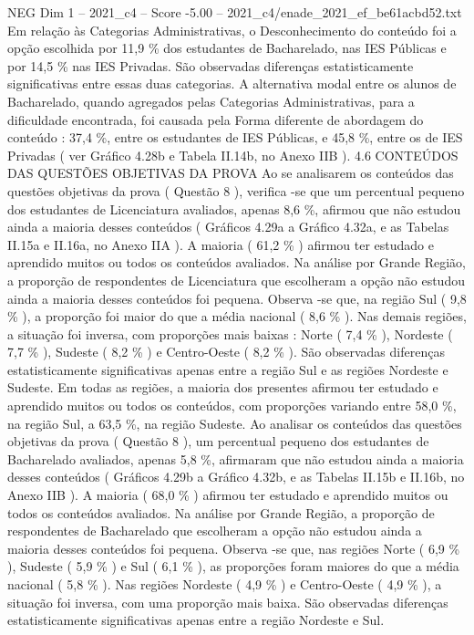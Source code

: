 \begin{textsample}{NEG Dim 1 – 2021\_c4 – Score -5.00 – 2021\_c4/enade\_2021\_ef\_be61acbd52.txt}
Em relação às Categorias Administrativas, o Desconhecimento do conteúdo foi a opção escolhida por 11,9 \% dos estudantes de Bacharelado, nas IES Públicas e por 14,5 \% nas IES Privadas.
São observadas diferenças estatisticamente significativas entre essas duas categorias.
A alternativa modal entre os alunos de Bacharelado, quando agregados pelas Categorias Administrativas, para a dificuldade encontrada, foi causada pela Forma diferente de abordagem do conteúdo : 37,4 \%, entre os estudantes de IES Públicas, e 45,8 \%, entre os de IES Privadas ( ver Gráfico 4.28b e Tabela II.14b, no Anexo IIB ). 4.6 CONTEÚDOS DAS QUESTÕES OBJETIVAS DA PROVA Ao se analisarem os conteúdos das questões objetivas da prova ( Questão 8 ), verifica -se que um percentual pequeno dos estudantes de Licenciatura avaliados, apenas 8,6 \%, afirmou que não estudou ainda a maioria desses conteúdos ( Gráficos 4.29a a Gráfico 4.32a, e as Tabelas II.15a e II.16a, no Anexo IIA ).
A maioria ( 61,2 \% ) afirmou ter estudado e aprendido muitos ou todos os conteúdos avaliados.
Na análise por Grande Região, a proporção de respondentes de Licenciatura que escolheram a opção não estudou ainda a maioria desses conteúdos foi pequena.
Observa -se que, na região Sul ( 9,8 \% ), a proporção foi maior do que a média nacional ( 8,6 \% ).
Nas demais regiões, a situação foi inversa, com proporções mais baixas : Norte ( 7,4 \% ), Nordeste ( 7,7 \% ), Sudeste ( 8,2 \% ) e Centro-Oeste ( 8,2 \% ).
São observadas diferenças estatisticamente significativas apenas entre a região Sul e as regiões Nordeste e Sudeste.
Em todas as regiões, a maioria dos presentes afirmou ter estudado e aprendido muitos ou todos os conteúdos, com proporções variando entre 58,0 \%, na região Sul, a 63,5 \%, na região Sudeste.
Ao analisar os conteúdos das questões objetivas da prova ( Questão 8 ), um percentual pequeno dos estudantes de Bacharelado avaliados, apenas 5,8 \%, afirmaram que não estudou ainda a maioria desses conteúdos ( Gráficos 4.29b a Gráfico 4.32b, e as Tabelas II.15b e II.16b, no Anexo IIB ).
A maioria ( 68,0 \% ) afirmou ter estudado e aprendido muitos ou todos os conteúdos avaliados.
Na análise por Grande Região, a proporção de respondentes de Bacharelado que escolheram a opção não estudou ainda a maioria desses conteúdos foi pequena.
Observa -se que, nas regiões Norte ( 6,9 \% ), Sudeste ( 5,9 \% ) e Sul ( 6,1 \% ), as proporções foram maiores do que a média nacional ( 5,8 \% ).
Nas regiões Nordeste ( 4,9 \% ) e Centro-Oeste ( 4,9 \% ), a situação foi inversa, com uma proporção mais baixa.
São observadas diferenças estatisticamente significativas apenas entre a região Nordeste e Sul.

\end{textsample}
